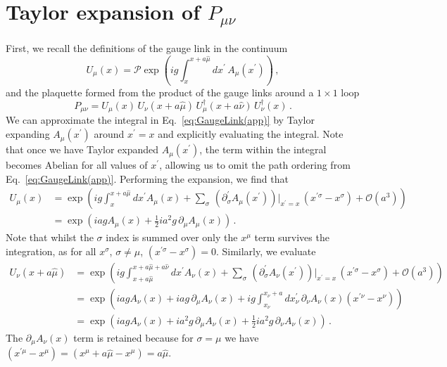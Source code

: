 \chapter{Taylor expansion of $P_{\mu\nu}$}\label{app:TEPlaquette}
First, we recall the definitions of the gauge link in the continuum
%
\begin{equation}
U_\mu(x) = \mathcal{P}\exp\left(ig\int_x^{x+a\hat{\mu}}dx^\prime \, A_\mu(x^\prime)\right)  \, ,
\label{eq:GaugeLink(app)}
\end{equation}
%
and the plaquette formed from the product of the gauge links around a $1\times 1$ loop
\begin{equation}
P_{\mu\nu} = U_\mu(x)\,U_\nu(x+a\hat{\mu})\,U^\dagger_\mu(x+a\hat{\nu})\,U^\dagger_\nu(x)\, .
\label{eq:Plaquette(app)}
\end{equation}
%
We can approximate the integral in Eq.~\ref{eq:GaugeLink(app)} by Taylor expanding $A_\mu(x^\prime)$ around $x^\prime=x$ and explicitly evaluating the integral. Note that once we have Taylor expanded $A_\mu(x^\prime)$, the term within the integral becomes Abelian for all values of $x^\prime$, allowing us to omit the path ordering from Eq.~\ref{eq:GaugeLink(app)}. Performing the expansion, we find that
%
\begin{align}
U_\mu(x)&=\exp\left(ig\int_x^{x+a\hat{\mu}} dx^\prime A_\mu\left(x\right) + \sum_\sigma \, \left(\partial^\prime_\sigma A_\mu(x^\prime)\right)\big|_{x^\prime = x}\,(x^{\prime\sigma} - x^\sigma) + \mathcal{O}(a^3)\right)\nonumber\\
&=\exp\left(iag A_\mu\left(x\right) + \frac{1}{2}ia^2 g\, \partial_\mu A_\mu\left(x\right)\right)\, . \label{eq:UTaylor}
\end{align}
%
Note that whilst the $\sigma$ index is summed over only the $x^\mu$ term survives the integration, as for all $x^\sigma$, $\sigma\neq \mu$, $(x^{\prime\sigma}-x^\sigma)=0$. Similarly, we evaluate
%
\begin{align}
U_\nu(x+a\hat{\mu}) &= \exp\left(ig\int_{x+a\hat{\mu}}^{x+a\hat{\mu}+a\hat{\nu}} dx^\prime A_\nu\left(x\right) + \sum_\sigma\,\left(\partial^\prime_\sigma A_\nu(x^\prime)\right)\big|_{x^\prime = x}\,(x^{\prime\sigma} - x^\sigma) + \mathcal{O}(a^3)\right)\nonumber\\
&= \exp\left( iag A_\nu(x) + iag\,\partial_\mu A_\nu (x) + ig\int_{x_\nu}^{x_\nu+a} dx^\prime_\nu \, \partial_\nu A_\nu (x) (x^{\prime\nu} - x^\nu)\right)\nonumber\\
&= \exp\left(iag A_\nu(x) + ia^2g\,\partial_\mu A_\nu(x) + \frac{1}{2}ia^2 g\,\partial_\nu A_\nu(x)\right)\, . \label{eq:UTaylor2}
\end{align}
%
The $\partial_\mu A_\nu (x)$ term is retained because for $\sigma = \mu$ we have $(x^{\prime\mu} - x^\mu) = (x^\mu + a\hat{\mu} - x^\mu) = a\hat{\mu}$.\\

